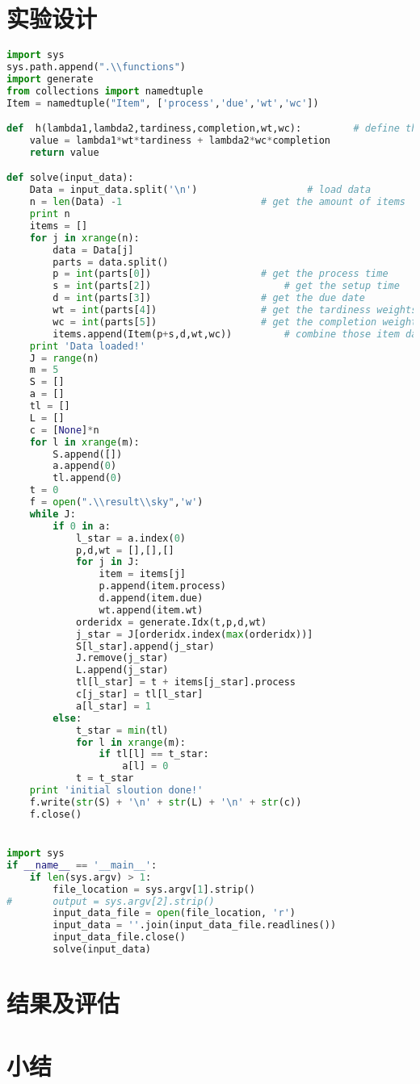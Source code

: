 \section{实验设计}
\begin{lstlisting}[language = Python]
import sys
sys.path.append(".\\functions")
import generate
from collections import namedtuple
Item = namedtuple("Item", ['process','due','wt','wc'])

def  h(lambda1,lambda2,tardiness,completion,wt,wc):			# define the contribution of one item for the obj function
	value = lambda1*wt*tardiness + lambda2*wc*completion
	return value

def solve(input_data):
	Data = input_data.split('\n')					# load data
	n = len(Data) -1						# get the amount of items
	print n
	items = []
	for j in xrange(n):
		data = Data[j]
		parts = data.split()
		p = int(parts[0])					# get the process time
		s = int(parts[2])						# get the setup time
		d = int(parts[3])					# get the due date
		wt = int(parts[4])					# get the tardiness weights
		wc = int(parts[5])					# get the completion weights
		items.append(Item(p+s,d,wt,wc))			# combine those item data
	print 'Data loaded!'
	J = range(n)
	m = 5
	S = []
	a = []
	tl = []
	L = []
	c = [None]*n
	for l in xrange(m):
		S.append([])
		a.append(0)
		tl.append(0)
	t = 0
	f = open(".\\result\\sky",'w')
	while J:
		if 0 in a:
			l_star = a.index(0)
			p,d,wt = [],[],[]
			for j in J:				
				item = items[j]
				p.append(item.process)
				d.append(item.due)
				wt.append(item.wt)
			orderidx = generate.Idx(t,p,d,wt)
			j_star = J[orderidx.index(max(orderidx))]
			S[l_star].append(j_star)
			J.remove(j_star)
			L.append(j_star)
			tl[l_star] = t + items[j_star].process
			c[j_star] = tl[l_star]
			a[l_star] = 1
		else:
			t_star = min(tl)
			for l in xrange(m):
				if tl[l] == t_star:
					a[l] = 0
			t = t_star
	print 'initial sloution done!'
	f.write(str(S) + '\n' + str(L) + '\n' + str(c))
	f.close()


import sys
if __name__ == '__main__':
	if len(sys.argv) > 1:
		file_location = sys.argv[1].strip()
#		output = sys.argv[2].strip()
		input_data_file = open(file_location, 'r')
		input_data = ''.join(input_data_file.readlines())
		input_data_file.close()
		solve(input_data)
\end{lstlisting}

\section{结果及评估}


\section{小结}